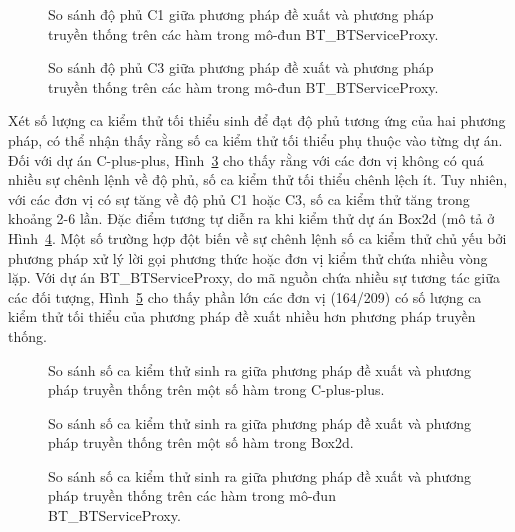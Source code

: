 \begin{figure}[H]
	\centering
	
	\caption{So sánh độ phủ C1 giữa phương pháp đề xuất và phương pháp truyền thống trên các hàm trong mô-đun BT\_BTServiceProxy.}
	\label{fig:c1-serviceproxy}
\end{figure}

\begin{figure}[H]
	\centering
	
	\caption{So sánh độ phủ C3 giữa phương pháp đề xuất và phương pháp truyền thống trên các hàm trong mô-đun BT\_BTServiceProxy.}
	\label{fig:c3-serviceproxy}
\end{figure}

Xét số lượng ca kiểm thử tối thiểu sinh để đạt độ phủ tương ứng của hai phương pháp, có thể nhận thấy rằng số ca kiểm thử tối thiểu phụ thuộc vào từng dự án. Đối với dự án C-plus-plus, Hình~\ref{fig:num-algo} cho thấy rằng với các đơn vị không có quá nhiều sự chênh lệnh về độ phủ, số ca kiểm thử tối thiểu chênh lệch ít. Tuy nhiên, với các đơn vị có sự tăng về độ phủ C1 hoặc C3, số ca kiểm thử tăng trong khoảng 2-6 lần. Đặc điểm tương tự diễn ra khi kiểm thử dự án Box2d (mô tả ở Hình~\ref{fig:num-box2d}. Một số trường hợp đột biến về sự chênh lệnh số ca kiểm thử chủ yếu bởi phương pháp xử lý lời gọi phương thức hoặc đơn vị kiểm thử chứa nhiều vòng lặp. Với dự án BT\_BTServiceProxy, do mã nguồn chứa nhiều sự tương tác giữa các đối tượng, Hình~\ref{fig:num-serviceproxy} cho thấy phần lớn các đơn vị (164/209) có số lượng ca kiểm thử tối thiểu của phương pháp đề xuất nhiều hơn phương pháp truyền thống.

\begin{figure}[H]
    \centering
    
    \caption{So sánh số ca kiểm thử sinh ra giữa phương pháp đề xuất và phương pháp truyền thống trên một số hàm trong C-plus-plus.}
    \label{fig:num-algo}
\end{figure}

\begin{figure}[H]
	\centering
	
	\caption{So sánh số ca kiểm thử sinh ra giữa phương pháp đề xuất và phương pháp truyền thống trên một số hàm trong Box2d.}
	\label{fig:num-box2d}
\end{figure}

\begin{figure}[H]
	\centering
	
	\caption{So sánh số ca kiểm thử sinh ra giữa phương pháp đề xuất và phương pháp truyền thống trên các hàm trong mô-đun BT\_BTServiceProxy.}
	\label{fig:num-serviceproxy}
\end{figure}

